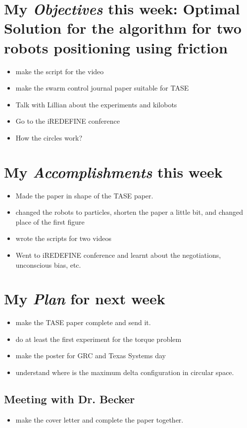 \newcommand{\handoutName}{Weekly report}
\newcommand{\handoutdate}{\today}


\section{My \emph{Objectives} this week: Optimal Solution for the algorithm for two robots positioning using friction}
\begin{itemize}
\item make the script for the video
\item make the swarm control journal paper suitable for TASE
\item Talk with Lillian about the experiments and kilobots
\item Go to the iREDEFINE conference
\item How the circles work?
\end{itemize}



\section{My \emph{Accomplishments} this week}


\begin{itemize}
\item Made the paper in shape of the TASE paper.
\item changed the robots to particles, shorten the paper a little bit, and changed place of the first figure
\item wrote the scripts for two videos
\item Went to iREDEFINE conference and learnt about the negotiations, unconscious bias, etc. 
\end{itemize}


\section{My \emph{Plan} for next week}

\begin{itemize}
\item make the TASE paper complete and send it.
\item do at least the first experiment for the torque problem
\item make the poster for GRC and Texas Systems day
\item understand where is the maximum delta configuration in circular space.
\end{itemize}

\subsection{Meeting with Dr. Becker  }

\begin{itemize}
\item make the cover letter and complete the paper together.
\end{itemize}



